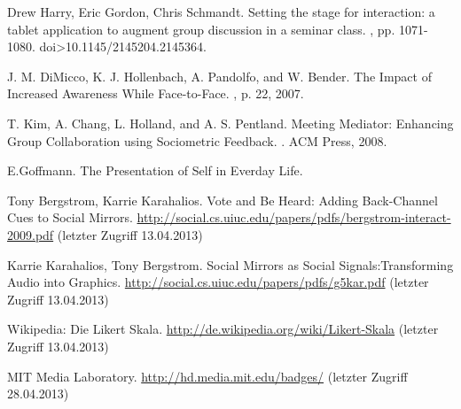\documentclass{seminarvorlage}
\begin{document}
\begin{thebibliography}{9}

Drew Harry, Eric Gordon, Chris Schmandt.
\newblock Setting the stage for interaction: a tablet application to augment group discussion in a seminar class. 
, pp. 1071-1080. doi>10.1145/2145204.2145364. 

J. M. DiMicco, K. J. Hollenbach, A. Pandolfo, and W. Bender.
\newblock The Impact of Increased Awareness While Face-to-Face.
, p. 22, 2007.

T. Kim, A. Chang, L. Holland, and A. S. Pentland.
\newblock Meeting Mediator: Enhancing Group Collaboration using Sociometric Feedback. 
. ACM Press, 2008.

E.Goffmann.
\newblock The Presentation of Self in Everday Life.

Tony Bergstrom, Karrie Karahalios. 
\newblock Vote and Be Heard: Adding Back-Channel Cues to Social Mirrors.
 \url {http://social.cs.uiuc.edu/papers/pdfs/bergstrom-interact-2009.pdf} (letzter Zugriff 13.04.2013)

Karrie Karahalios, Tony Bergstrom. 
\newblock Social Mirrors as Social Signals:Transforming Audio into Graphics.
 \url {http://social.cs.uiuc.edu/papers/pdfs/g5kar.pdf} (letzter Zugriff 13.04.2013)

Wikipedia: Die Likert Skala.
\newblock \url {http://de.wikipedia.org/wiki/Likert-Skala} (letzter Zugriff 13.04.2013)

 MIT Media Laboratory. 
\newblock \url {http://hd.media.mit.edu/badges/} (letzter Zugriff 28.04.2013)

\end{thebibliography}
\end{document}
